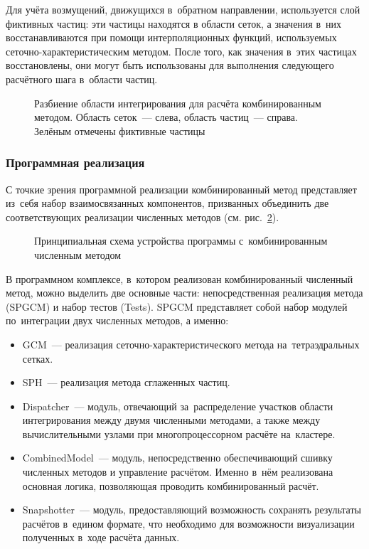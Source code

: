 \documentclass[thesis.tex]{subfiles}
\begin{document}
Для учёта возмущений, движущихся в~обратном направлении, используется слой фиктивных частиц: эти частицы находятся в
области сеток, а значения в~них восстанавливаются при помощи интерполяционных функций, используемых
сеточно-характеристическим методом. После того, как значения в~этих частицах восстановлены, они могут быть использованы
для выполнения следующего расчётного шага в~области частиц.

\begin{figure}[th!]
    \begin{center}
        
    \end{center}
    \caption{Разбиение области интегрирования для расчёта комбинированным методом. Область сеток~--- слева, область
             частиц~--- справа. Зелёным отмечены фиктивные частицы}
    \label{рис:spgcm}
\end{figure}

\subsubsection{Программная реализация}

С точкие зрения программной реализации комбинированный метод представляет из~себя набор взаимосвязанных компонентов,
призванных объединить две соответствующих реализации численных методов (см. рис.~\ref{рис:комбинированный-бинарник}).

\begin{figure}[th!]
    \begin{center}
        
    \end{center}
    \caption{Принципиальная схема устройства программы с~комбинированным численным методом}
    \label{рис:комбинированный-бинарник}
\end{figure}

В программном комплексе, в~котором реализован комбинированный численный метод, можно выделить две основные части:
непосредственная реализация метода (SPGCM) и набор тестов (Tests). SPGCM представляет собой набор модулей по~интеграции
двух численных методов, а именно:
\begin{itemize}
    \item GCM~--- реализация сеточно-характеристического метода на~тетраэдральных сетках.
    \item SPH~--- реализация метода сглаженных частиц.
    \item Dispatcher~--- модуль, отвечающий за~распределение участков области интегрирования между двумя численными
    методами, а также между вычислительными узлами при многопроцессорном расчёте на~кластере.
    \item CombinedModel~--- модуль, непосредственно обеспечивающий сшивку численных методов и управление расчётом. Именно
    в~нём реализована основная логика, позволяющая проводить комбинированный расчёт.
    \item Snapshotter~--- модуль, предоставляющий возможность сохранять результаты расчётов в~едином формате, что
    необходимо для возможности визуализации полученных в~ходе расчёта данных.
\end{itemize}
\end{document}
